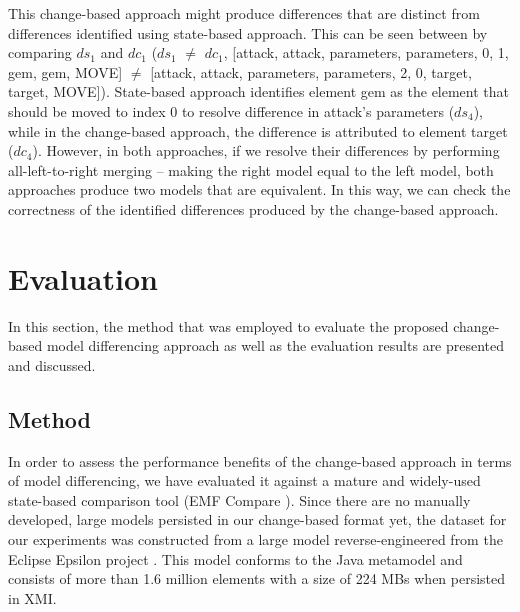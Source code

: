 This change-based approach might produce differences that are distinct from differences identified using state-based approach. This can be seen between by comparing $ds_{1}$ and $dc_{1}$ ($ds_{1}$ $\neq$ $dc_{1}$,  [\textsf{attack}, \textsf{attack}, \textsf{parameters}, \textsf{parameters}, 0, 1, \textsf{gem}, \textsf{gem}, \textsf{MOVE}] $\neq$ [\textsf{attack}, \textsf{attack}, \textsf{parameters}, \textsf{parameters}, 2, 0, \textsf{target}, \textsf{target}, \textsf{MOVE}]). State-based approach identifies element \textsf{gem} as the element that should be moved to index 0 to resolve difference in \textsf{attack}'s \textsf{parameters} ($ds_{4}$), while in the change-based approach, the difference is attributed to element \textsf{target} ($dc_{4}$). However, in both approaches, if we resolve their differences by performing all-left-to-right merging  -- making the right model equal to the left model, both approaches produce two models that are equivalent. In this way, we can check the correctness of the identified differences produced by the change-based approach.

\vspace{-10pt}
\section{Evaluation}
\label{sec:evaluation_6}
In this section, the method that was employed to evaluate the proposed change-based model differencing approach as well as the evaluation results are presented and discussed. 

\subsection{Method}
\label{sec:method}
In order to assess the performance benefits of the change-based approach in terms of model differencing, we have evaluated it against a mature and widely-used state-based comparison tool (EMF Compare \cite{emfcompare2018developer,eclipse2017compare}). Since there are no manually developed, large models persisted in our change-based format yet, the dataset for our experiments was constructed from a large model reverse-engineered from the Eclipse Epsilon project \cite{eclipse2018epsilongit,eclipse2017epsilon}. This model conforms to the Java metamodel \cite{eclipse2018modiscojava} and consists of more than 1.6 million elements with a size of 224 MBs when persisted in XMI. 

